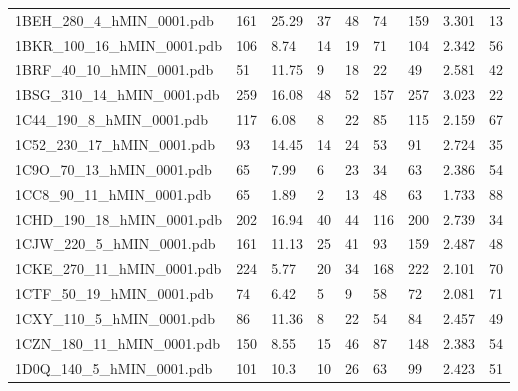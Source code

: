 \documentclass{bioinfo}
\begin{document}
\begin{table}[!t]
{\begin{tabular}{lllllllll}
    1BEH\_280\_4\_hMIN\_0001.pdb & 161      & 25.29      & 37          & 48          & 74          & 159     & 3.301           & 13           \\
    1BKR\_100\_16\_hMIN\_0001.pdb & 106      & 8.74       & 14          & 19          & 71          & 104     & 2.342           & 56           \\
    1BRF\_40\_10\_hMIN\_0001.pdb & 51       & 11.75      & 9           & 18          & 22          & 49      & 2.581           & 42           \\
    1BSG\_310\_14\_hMIN\_0001.pdb & 259      & 16.08      & 48          & 52          & 157         & 257     & 3.023           & 22           \\
    1C44\_190\_8\_hMIN\_0001.pdb & 117      & 6.08       & 8           & 22          & 85          & 115     & 2.159           & 67           \\
    1C52\_230\_17\_hMIN\_0001.pdb & 93       & 14.45      & 14          & 24          & 53          & 91      & 2.724           & 35           \\
    1C9O\_70\_13\_hMIN\_0001.pdb & 65       & 7.99       & 6           & 23          & 34          & 63      & 2.386           & 54           \\
    1CC8\_90\_11\_hMIN\_0001.pdb & 65       & 1.89       & 2           & 13          & 48          & 63      & 1.733           & 88           \\
    1CHD\_190\_18\_hMIN\_0001.pdb & 202      & 16.94      & 40          & 44          & 116         & 200     & 2.739           & 34           \\
    1CJW\_220\_5\_hMIN\_0001.pdb & 161      & 11.13      & 25          & 41          & 93          & 159     & 2.487           & 48           \\
    1CKE\_270\_11\_hMIN\_0001.pdb & 224      & 5.77       & 20          & 34          & 168         & 222     & 2.101           & 70           \\
    1CTF\_50\_19\_hMIN\_0001.pdb & 74       & 6.42       & 5           & 9           & 58          & 72      & 2.081           & 71           \\
    1CXY\_110\_5\_hMIN\_0001.pdb & 86       & 11.36      & 8           & 22          & 54          & 84      & 2.457           & 49           \\
    1CZN\_180\_11\_hMIN\_0001.pdb & 150      & 8.55       & 15          & 46          & 87          & 148     & 2.383           & 54           \\
    1D0Q\_140\_5\_hMIN\_0001.pdb & 101      & 10.3       & 10          & 26          & 63          & 99      & 2.423           & 51           \\

\end{tabular}}
\end{table}
\end{document}
